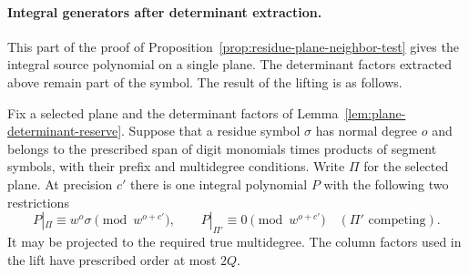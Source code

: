 \paragraph{Integral generators after determinant extraction.}
\hypertarget{source-plane-symbols}{}
This part of the proof of Proposition~\ref{prop:residue-plane-neighbor-test}
gives the integral source polynomial on a single plane.
The determinant factors extracted above remain part of the
symbol. The result of the lifting is as follows.

\begin{lemma}\label{lem:lift-plane-symbol}
Fix a selected plane and the determinant factors of
Lemma~\ref{lem:plane-determinant-reserve}. Suppose that a residue symbol
\(\sigma\) has normal degree \(o\) and belongs to the prescribed
span of digit monomials times products of segment symbols,
with their prefix and multidegree conditions. Write \(\Pi\) for the selected plane. At precision \(c'\) there is one integral polynomial \(P\) with the following two restrictions
\[
 P|_\Pi\equiv w^o\sigma\pmod{w^{o+c'}},\qquad P|_{\Pi'}\equiv0\pmod{w^{o+c'}}\quad(\Pi'\text{ competing}).
\]
 It may be projected to the required
true multidegree. The column factors used in the lift have
prescribed order at most \(2Q\).
\end{lemma}

